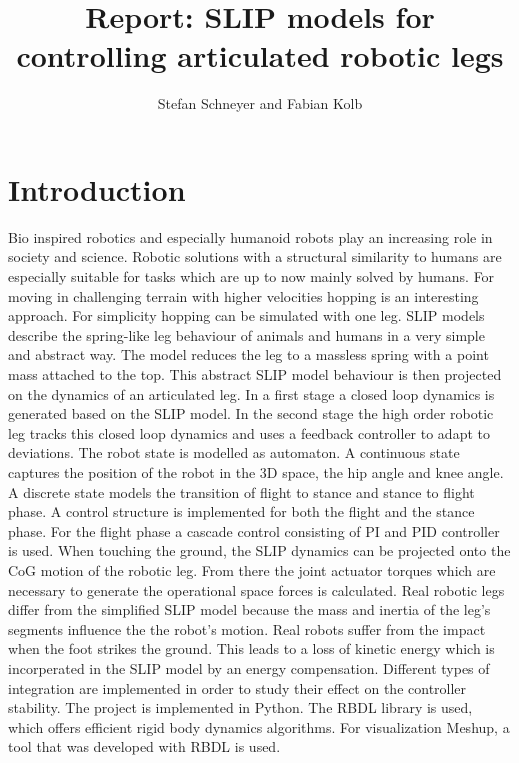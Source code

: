 \documentclass[10pt, conference]{IEEEtran}
\title{\LARGE \bf
Report: SLIP models for controlling articulated robotic legs
}
\author{Stefan Schneyer and Fabian Kolb}
\begin{document}
\maketitle
\thispagestyle{empty}
\pagestyle{empty}



\section{Introduction}


Bio inspired robotics and especially humanoid robots play an increasing role in society and science. Robotic solutions with a structural 
similarity to humans are especially suitable for tasks which are up to now mainly solved by humans. For moving in challenging terrain with higher velocities
hopping is an interesting approach. For simplicity hopping can be simulated with one leg. SLIP models describe the spring-like leg behaviour
of animals and humans in a very simple and abstract way. The model reduces the leg to a massless spring with a point mass attached to the top. 
This abstract SLIP model behaviour is then projected on the dynamics of an articulated leg. 
In a first stage a closed loop dynamics is generated based on the SLIP model. In the second stage the high order robotic leg tracks this closed loop dynamics 
and uses a feedback controller to adapt to deviations. The robot state is modelled as automaton. A continuous state captures the position of the 
robot in the 3D space, the hip angle and knee angle. A discrete state models the transition of flight to stance and stance to flight phase. 
A control structure is implemented for both the flight and the stance phase. 
For the flight phase a cascade control consisting of PI and PID controller is used. When touching the ground, the SLIP dynamics can be 
projected onto the CoG motion of the robotic leg. From there the joint actuator torques which are necessary to generate the operational space 
forces is calculated. Real robotic legs differ from the simplified SLIP model because the mass and inertia of the leg's segments influence the 
the robot's motion. Real robots suffer from the impact when the foot strikes the ground. This leads to a loss of kinetic energy which is incorperated in 
the SLIP model by an energy compensation. Different types of integration are implemented in order to study their effect on the controller stability. 
The project is implemented in Python. The RBDL library is used, which offers efficient rigid body dynamics algorithms. 
For visualization Meshup, a tool that was developed with RBDL is used.
\end{document}

